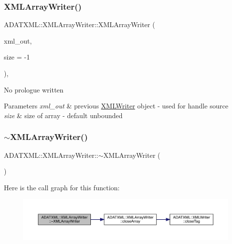 \subsubsection{\texorpdfstring{XMLArrayWriter()}{XMLArrayWriter()}\hspace{0.1cm}{\footnotesize\ttfamily [1/2]}}
{\footnotesize\ttfamily A\+D\+A\+T\+X\+M\+L\+::\+X\+M\+L\+Array\+Writer\+::\+X\+M\+L\+Array\+Writer (\begin{DoxyParamCaption}\item[{\mbox{\hyperlink{classADATXML_1_1XMLWriter}{X\+M\+L\+Writer}} \&}]{xml\+\_\+out,  }\item[{int}]{size = {\ttfamily -\/1} }\end{DoxyParamCaption})\hspace{0.3cm}{\ttfamily [inline]}, {\ttfamily [explicit]}}

No prologue written 
\begin{DoxyParams}{Parameters}
{\em xml\+\_\+out} & previous \mbox{\hyperlink{classADATXML_1_1XMLWriter}{X\+M\+L\+Writer}} object -\/ used for handle source \\
\hline
{\em size} & size of array -\/ default unbounded \\
\hline
\end{DoxyParams}
\mbox{\label{classADATXML_1_1XMLArrayWriter_ac1e9df12a7df4c52d6026c3b814abf65}} 
\subsubsection{\texorpdfstring{$\sim$XMLArrayWriter()}{~XMLArrayWriter()}\hspace{0.1cm}{\footnotesize\ttfamily [1/2]}}
{\footnotesize\ttfamily A\+D\+A\+T\+X\+M\+L\+::\+X\+M\+L\+Array\+Writer\+::$\sim$\+X\+M\+L\+Array\+Writer (\begin{DoxyParamCaption}{ }\end{DoxyParamCaption})}

Here is the call graph for this function\+:\nopagebreak
\begin{figure}[H]
\begin{center}
\leavevmode
\includegraphics[width=350pt]{dc/df3/classADATXML_1_1XMLArrayWriter_ac1e9df12a7df4c52d6026c3b814abf65_cgraph}
\end{center}
\end{figure}
\mbox{\label{classADATXML_1_1XMLArrayWriter_a51816af0342b997945b0d21e4ba30c5d}} 
